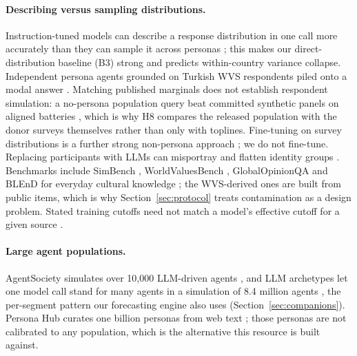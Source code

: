 \documentclass[10pt]{article}
\begin{document}
\paragraph{Describing versus sampling distributions.} Instruction-tuned models can describe a response distribution in one call more accurately than they can sample it across personas \citep{jang2026,meister2025}; this makes our direct-distribution baseline (B3) strong and predicts within-country variance collapse. Independent persona agents grounded on Turkish WVS respondents piled onto a modal answer \citep{ozkan2026}. Matching published marginals does not establish respondent simulation: a no-persona population query beat committed synthetic panels on aligned batteries \citep{doudkin2026}, which is why H8 compares the released population with the donor surveys themselves rather than only with toplines. Fine-tuning on survey distributions is a further strong non-persona approach \citep{suh2025subpop}; we do not fine-tune. Replacing participants with LLMs can misportray and flatten identity groups \citep{wang2024flatten}. Benchmarks include SimBench \citep{hu2026simbench}, WorldValuesBench \citep{zhao2024wvb}, GlobalOpinionQA \citep{durmus2023} and BLEnD for everyday cultural knowledge \citep{myung2024blend}; the WVS-derived ones are built from public items, which is why Section~\ref{sec:protocol} treats contamination as a design problem. Stated training cutoffs need not match a model's effective cutoff for a given source \citep{cheng2024dated}.

\paragraph{Large agent populations.} AgentSociety simulates over 10,000 LLM-driven agents \citep{piao2025agentsociety}, and LLM archetypes let one model call stand for many agents in a simulation of 8.4 million agents \citep{chopra2024limits}, the per-segment pattern our forecasting engine also uses (Section~\ref{sec:companions}). Persona Hub curates one billion personas from web text \citep{ge2024personas}; those personas are not calibrated to any population, which is the alternative this resource is built against.
\end{document}
